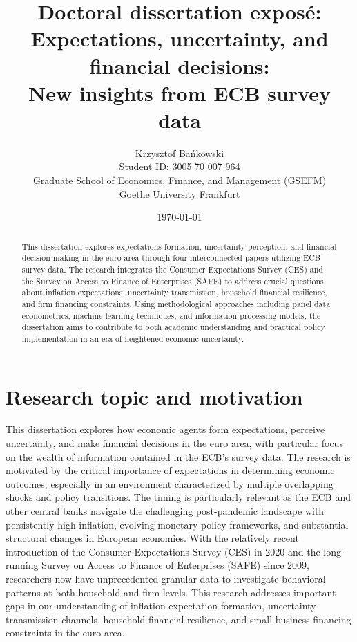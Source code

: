 \documentclass[11pt,a4paper]{article}
\title{\Large Doctoral dissertation exposé:\\[1em] 
       \huge\textbf{Expectations, uncertainty, and financial decisions:\\
       New insights from ECB survey data}}
\author{Krzysztof Bańkowski\\[0.5em]
        Student ID: 3005 70 007 964\\
        Graduate School of Economics, Finance, and Management (GSEFM)\\
        Goethe University Frankfurt}
\date{\today}
\begin{document}
\maketitle

\begin{abstract}
This dissertation explores expectations formation, uncertainty perception, and financial decision-making in the euro area through four interconnected papers utilizing ECB survey data. The research integrates the Consumer Expectations Survey (CES) and the Survey on Access to Finance of Enterprises (SAFE) to address crucial questions about inflation expectations, uncertainty transmission, household financial resilience, and firm financing constraints. Using methodological approaches including panel data econometrics, machine learning techniques, and information processing models, the dissertation aims to contribute to both academic understanding and practical policy implementation in an era of heightened economic uncertainty.
\end{abstract}

\section*{Research topic and motivation}
This dissertation explores how economic agents form expectations, perceive uncertainty, and make financial decisions in the euro area, with particular focus on the wealth of information contained in the ECB's survey data. The research is motivated by the critical importance of expectations in determining economic outcomes, especially in an environment characterized by multiple overlapping shocks and policy transitions. The timing is particularly relevant as the ECB and other central banks navigate the challenging post-pandemic landscape with persistently high inflation, evolving monetary policy frameworks, and substantial structural changes in European economies. With the relatively recent introduction of the Consumer Expectations Survey (CES) in 2020 and the long-running Survey on Access to Finance of Enterprises (SAFE) since 2009, researchers now have unprecedented granular data to investigate behavioral patterns at both household and firm levels. This research addresses important gaps in our understanding of inflation expectation formation, uncertainty transmission channels, household financial resilience, and small business financing constraints in the euro area.
\end{document}
